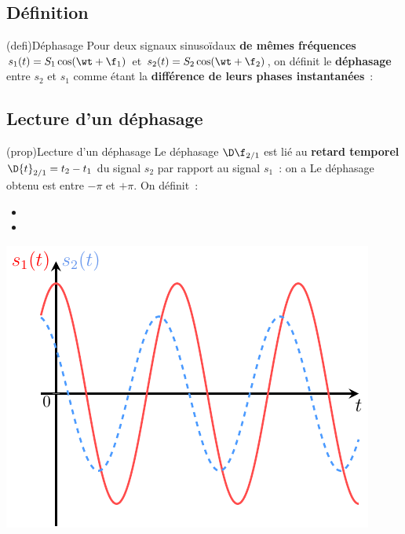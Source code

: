 \documentclass[../../main/main.tex]{subfiles}
\begin{document}
\subsection{Définition}
\begin{tcb*}(defi){Déphasage}
	Pour deux signaux sinusoïdaux \textbf{de mêmes fréquences} $s_1(t) =
		S_1\cos(\wt+\f_1)$ et $s_2(t) = S_2\cos(\wt+\f_2)$, on définit le
	\textbf{déphasage} entre $s_2$ et $s_1$ comme étant la \textbf{différence de
		leurs phases instantanées}~:
	\psw{%
		\[
			\D\f_{2/1} = (\wt + \f_2) - (\wt+\f_1)
			\Lra
			\boxed{\D\f_{2/1} = \f_2 - \f_1}
		\]
	}%
	\vspace{-15pt}
\end{tcb*}

\subsection{Lecture d'un déphasage}

\begin{tcb*}[sidebyside, righthand ratio=.3](prop){Lecture d'un déphasage}
	Le déphasage $\D\f_{2/1}$ est lié au \textbf{retard temporel}
	$\D{t}_{2/1} = t_2 - t_1$ du signal $s_2$ par rapport au signal $s_1$~: on a
	\psw{%
		\[\boxed{\abs{\D\f_{2/1}} = \pm \w \abs{\D{t}_{2/1}}}\]
	}%
	Le déphasage obtenu est entre $-\pi$ et $+\pi$. On définit~:
	\begin{itemize}
		\item {}%
		\item {}%
	\end{itemize}
	\tcblower
	\begin{center}
		\includegraphics[width=\linewidth]{dfeqr}
		\captionsetup{justification=centering}
	\end{center}
\end{tcb*}
\end{document}
